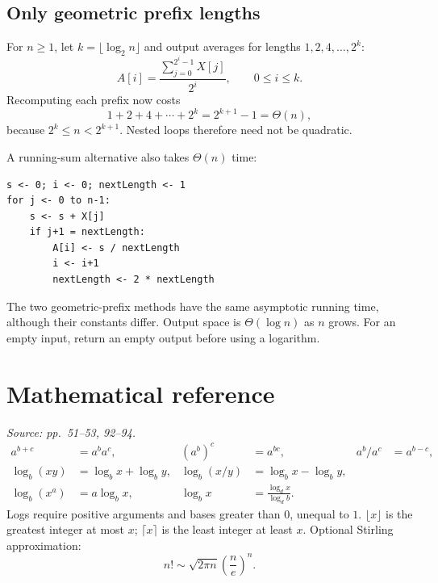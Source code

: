\documentclass[11pt]{article}
\begin{document}
\subsection{Only geometric prefix lengths}
For $n\ge1$, let $k=\lfloor\log_2 n\rfloor$ and output averages for lengths $1,2,4,\ldots,2^k$:
\[
A[i]=\frac{\sum_{j=0}^{2^i-1}X[j]}{2^i},\qquad 0\le i\le k.
\]
Recomputing each prefix now costs
\[
1+2+4+\cdots+2^k=2^{k+1}-1=\Theta(n),
\]
because $2^k\le n<2^{k+1}$. Nested loops therefore need not be quadratic.

A running-sum alternative also takes $\Theta(n)$ time:
\begin{lstlisting}
s <- 0; i <- 0; nextLength <- 1
for j <- 0 to n-1:
    s <- s + X[j]
    if j+1 = nextLength:
        A[i] <- s / nextLength
        i <- i+1
        nextLength <- 2 * nextLength
\end{lstlisting}
The two geometric-prefix methods have the same asymptotic running time, although their constants differ. Output space is $\Theta(\log n)$ as $n$ grows. For an empty input, return an empty output before using a logarithm.

\section{Mathematical reference}
\textit{Source: pp.\ 51--53, 92--94.}
\begin{align*}
a^{b+c}&=a^ba^c,& (a^b)^c&=a^{bc},&a^b/a^c&=a^{b-c},\\
\log_b(xy)&=\log_bx+\log_by,&
\log_b(x/y)&=\log_bx-\log_by,\\
\log_b(x^a)&=a\log_bx,&
\log_bx&=\frac{\log_dx}{\log_db}.
\end{align*}
Logs require positive arguments and bases greater than $0$, unequal to $1$. $\lfloor x\rfloor$ is the greatest integer at most $x$; $\lceil x\rceil$ is the least integer at least $x$. Optional Stirling approximation:
\[
n!\sim\sqrt{2\pi n}\left(\frac ne\right)^n.
\]
\end{document}
